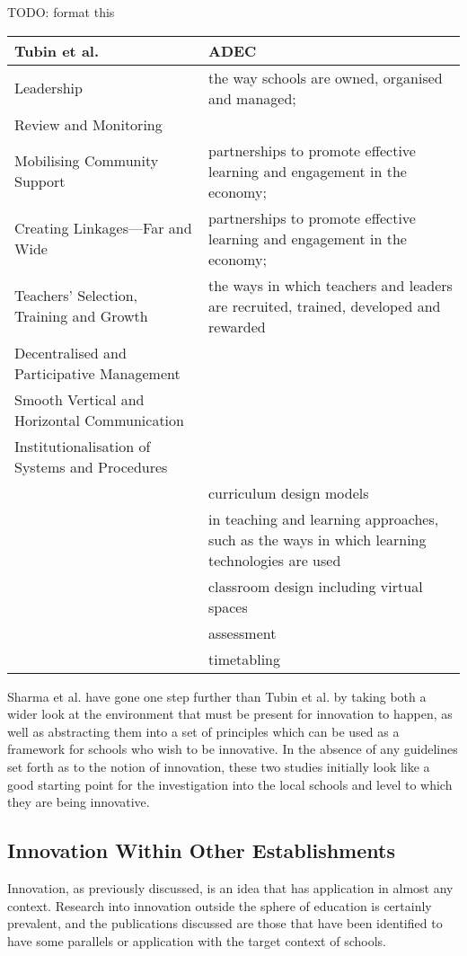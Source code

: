TODO: format this
\begin{center}
    \begin{tabular}{ | l | p{5cm} |}
    Tubin et al.  & ADEC \\ \hline
    Leadership & the way schools are owned, organised and managed;  \\ \hline
    Review and Monitoring  &  \\ \hline
    Mobilising Community Support &  partnerships to promote effective learning and engagement in the economy; \\ \hline
    Creating Linkages—Far and Wide &  partnerships to promote effective learning and engagement in the economy; \\ \hline
    Teachers’ Selection, Training and Growth & the ways in which teachers and leaders are recruited, trained, developed and rewarded \\ \hline
    Decentralised and Participative Management &  \\ \hline
    Smooth Vertical and Horizontal Communication &  \\ \hline
    Institutionalisation of Systems and Procedures &  \\ \hline
     & curriculum design models \\ \hline
     & in teaching and learning approaches, such as the ways in which learning technologies are used \\ \hline
     & classroom design including virtual spaces \\ \hline
     & assessment \\ \hline
     & timetabling \\ \hline
    \end{tabular} 
\end{center}


Sharma et al. have gone one step further than Tubin et al. by taking both a wider look at the environment that must be present for innovation to happen, as well as abstracting them into a set of principles which can be used as a framework for schools who wish to be innovative. In the absence of any guidelines set forth as to the notion of innovation, these two studies initially look like a good starting point for the investigation into the local schools and level to which they are being innovative.

\subsection{Innovation Within Other Establishments}
Innovation, as previously discussed, is an idea that has application in almost any context. Research into innovation outside the sphere of education is certainly prevalent, and the publications discussed are those that have been identified to have some parallels or application with the target context of schools.

